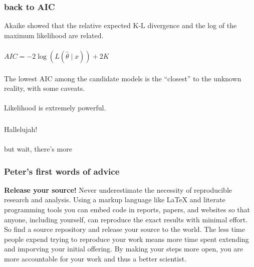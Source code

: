 \documentclass{beamer}\usepackage{graphicx, color}
\begin{document}
\begin{frame}
\frametitle{back to AIC}
Akaike showed that the relative expected K-L divergence and the log of the maximum likelihood are related.
\\~\\
\begin{math}
AIC = -2\log(L(\hat{\theta} \mid x)) + 2K
\end{math}
\\~\\
The lowest AIC among the candidate models is the ``closest'' to the unknown reality, with some caveats.
\\~\\
Likelihood is extremely powerful.

\end{frame}


\begin{frame}
\frametitle{}
\huge{Hallelujah!}
\\~\\
\small{but wait, there's more\!}
\end{frame}


\begin{frame}
\frametitle{Peter's first words of advice}
\textbf{Release your source!}
Never underestimate the necessity of reproducible research and analysis.
Using a markup language like {\LaTeX} and  literate programming tools you can embed code in reports, papers, and websites so that anyone, including yourself, can reproduce the exact results with minimal effort.
So find a source repository and release your source to the world.
The less time people expend trying to reproduce your work means more time spent extending and imporving your initial offering.
By making your steps more open, you are more accountable for your work and thus a better scientist.
\end{frame}
\end{document}
